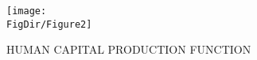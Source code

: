 \hypertarget{HCprodfunc}{}
\begin{figure}[tbp]
   \centerline{\texttt{[image: \\FigDir/Figure2]}}
  \caption{HUMAN CAPITAL PRODUCTION FUNCTION} 
  \label{fig:HCprodfunc}
\end{figure}
